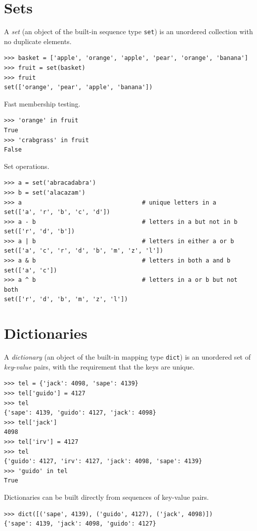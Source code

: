 \documentclass[8pt,a4paper,compress,handout]{beamer}
\begin{document}
\section{Sets}
\begin{frame}[fragile]
A \emph{set} (an object of the built-in sequence type \lstinline{set}) is an unordered collection with no duplicate elements.
\begin{lstlisting}[language={}]
>>> basket = ['apple', 'orange', 'apple', 'pear', 'orange', 'banana']
>>> fruit = set(basket)
>>> fruit
set(['orange', 'pear', 'apple', 'banana'])
\end{lstlisting}

\bigskip

Fast membership testing.
\begin{lstlisting}[language={}]
>>> 'orange' in fruit
True
>>> 'crabgrass' in fruit
False
\end{lstlisting}

\bigskip

Set operations.
\begin{lstlisting}[language={}]
>>> a = set('abracadabra')
>>> b = set('alacazam')
>>> a                                  # unique letters in a
set(['a', 'r', 'b', 'c', 'd'])
>>> a - b                              # letters in a but not in b
set(['r', 'd', 'b'])
>>> a | b                              # letters in either a or b
set(['a', 'c', 'r', 'd', 'b', 'm', 'z', 'l'])
>>> a & b                              # letters in both a and b
set(['a', 'c'])
>>> a ^ b                              # letters in a or b but not both
set(['r', 'd', 'b', 'm', 'z', 'l'])
\end{lstlisting}
\end{frame}

\section{Dictionaries}
\begin{frame}[fragile]
A \emph{dictionary} (an object of the built-in mapping type \lstinline{dict}) is an unordered set of \emph{key}-\emph{value} pairs, with the requirement that the keys are unique.
\begin{lstlisting}[language={}]
>>> tel = {'jack': 4098, 'sape': 4139}
>>> tel['guido'] = 4127
>>> tel
{'sape': 4139, 'guido': 4127, 'jack': 4098}
>>> tel['jack']
4098
>>> tel['irv'] = 4127
>>> tel
{'guido': 4127, 'irv': 4127, 'jack': 4098, 'sape': 4139}
>>> 'guido' in tel
True
\end{lstlisting}

\bigskip

Dictionaries can be built directly from sequences of key-value pairs.
\begin{lstlisting}[language={}]
>>> dict([('sape', 4139), ('guido', 4127), ('jack', 4098)])
{'sape': 4139, 'jack': 4098, 'guido': 4127}
\end{lstlisting}

\end{frame}
\end{document}
